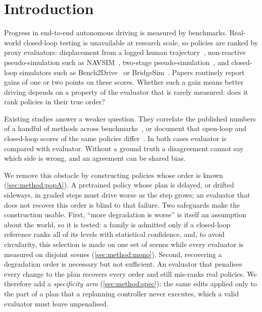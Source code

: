 \section{Introduction}
\label{sec:intro}

Progress in end-to-end autonomous driving is measured by benchmarks.
Real-world closed-loop testing is unavailable at research scale, so policies are ranked by proxy
evaluators: displacement from a logged human trajectory~\cite{zhai2023admlp,li2024egostatus},
non-reactive pseudo-simulation such as NAVSIM~\cite{dauner2024navsim}, two-stage
pseudo-simulation~\cite{cao2025pseudosim}, and closed-loop simulators such as
Bench2Drive~\cite{jia2024bench2drive} or BridgeSim~\cite{zhao2026bridgesim}.
Papers routinely report gains of one or two points on these scores.
Whether such a gain means better driving depends on a property of the evaluator that is rarely
measured: does it rank policies in their true order?

Existing studies answer a weaker question.
They correlate the published numbers of a handful of methods across benchmarks~\cite{wang2026olcl},
or document that open-loop and closed-loop scores of the same policies differ~\cite{zhao2026bridgesim}.
In both cases evaluator is compared with evaluator.
Without a ground truth a disagreement cannot say which side is wrong, and an agreement can be shared
bias.

We remove this obstacle by constructing policies whose order is known
(\cref{sec:method:popA}).
A pretrained policy whose plan is delayed, or drifted sideways, in graded steps must drive worse as the
step grows; an evaluator that does not recover this order is blind to that failure.
Two safeguards make the construction usable.
First, ``more degradation is worse'' is itself an assumption about the world, so it is tested: a family
is admitted only if a closed-loop reference ranks all of its levels with statistical confidence, and,
to avoid circularity, this selection is made on one set of scenes while every evaluator is measured on
disjoint scenes (\cref{sec:method:mono}).
Second, recovering a degradation order is necessary but not sufficient.
An evaluator that penalises every change to the plan recovers every order and still mis-ranks real
policies.
We therefore add a \emph{specificity arm} (\cref{sec:method:spec}): the same edits applied only to the
part of a plan that a replanning controller never executes, which a valid evaluator must leave
unpenalised.

